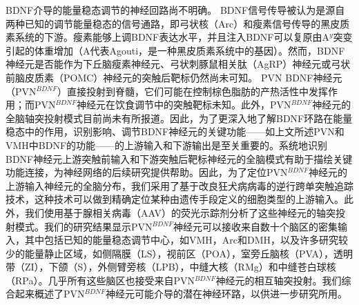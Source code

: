 BDNF介导的能量稳态调节的神经回路尚不明确。 BDNF信号传导被认为是源自两种已知的调节能量稳态的信号通路\citep{waterson2015neuronal, krashes2016melanocortin}，即弓状核（Arc）\citep{xu2003brain}和瘦素信号传导\citep{liao2012dendritically}的黑皮质素系统的下游。瘦素能够上调BDNF表达水平，并且注入BDNF可以复原由A$^{y}$突变引起的体重增加（A代表Agouti，是一种黑皮质素系统中的基因）。然而，BDNF神经元是否能作为下丘脑瘦素神经元、弓状刺豚鼠相关肽（AgRP）神经元或弓状前脑皮质素（POMC）神经元的突触后靶标仍然尚未可知。 PVN BDNF神经元（PVN$^{BDNF}$）直接投射到脊髓，它们可能在控制棕色脂肪的产热活性中发挥作用；而PVN$^{BDNF}$神经元在饮食调节中的突触靶标未知\citep{an2015discrete}。此外，PVN$^{BDNF}$神经元的全脑轴突投射模式目前尚未有所报道。因此，为了更深入地了解BDNF环路在能量稳态中的作用，识别影响、调节BDNF神经元的关键功能——如上文所述PVN和VMH中BDNF的功能——的上游输入和下游输出是至关重要的。系统地识别BDNF神经元上游突触前输入和下游突触后靶标神经元的全脑模式有助于描绘关键功能连接，为神经网络的后续研究提供帮助。因此，为了定位PVN$^{BDNF}$神经元的上游输入神经元的全脑分布，我们采用了基于改良狂犬病病毒的逆行跨单突触追踪技术，这种技术可以做到精确定位某种由遗传手段定义的细胞类型的上游输入\citep{wickersham2007monosynaptic}。此外，我们使用基于腺相关病毒（AAV）的荧光示踪剂分析了这些神经元的轴突投射模式。我们的研究结果显示PVN$^{BDNF}$神经元可以接收来自数十个脑区的密集输入，其中包括已知的能量稳态调节中心，如VMH，Arc和DMH，以及许多研究较少的能量静止区域，如侧隔膜（LS），视前区（POA），室旁丘脑核（PVA），透明带（ZI），下颌（S），外侧臂旁核（LPB），中缝大核（RMg）和中缝苍白球核（RPa）。几乎所有这些脑区也接受来自PVN$^{BDNF}$神经元的相互轴突投射。我们综合起来概述了PVN$^{BDNF}$神经元可能介导的潜在神经环路，以供进一步研究所用。
